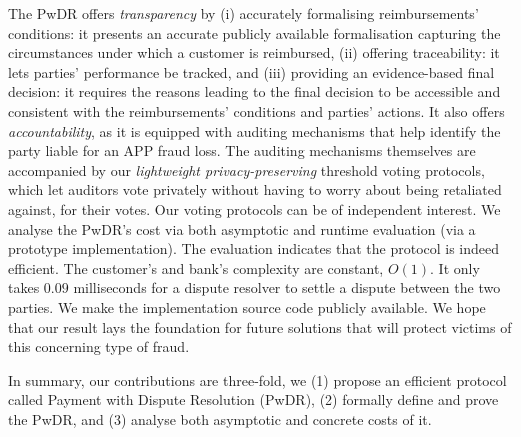   The PwDR offers \emph{transparency} by (i) accurately formalising reimbursements' conditions: it presents an accurate publicly available formalisation capturing the circumstances under which a customer is reimbursed,  (ii) offering traceability:  it lets parties'  performance be tracked, and (iii) providing an evidence-based final decision: it requires the reasons leading to the final decision to be accessible and consistent with the reimbursements' conditions and parties' actions.  It also offers \emph{accountability}, as it is equipped with auditing mechanisms that help identify the party liable for an APP fraud loss.  The auditing mechanisms themselves are accompanied by our \emph{lightweight privacy-preserving} threshold voting protocols, which let auditors vote privately without having to worry about being retaliated against,  for their votes. Our voting protocols can be of independent interest.   We analyse the PwDR's cost via both asymptotic and runtime evaluation (via a prototype implementation). The evaluation indicates that the protocol is indeed efficient. The customer's and bank's complexity are constant, $O(1)$. It only takes $0.09$ milliseconds for a dispute resolver to settle a dispute between the two parties. We make the implementation source code publicly available. We hope that our result lays the foundation for future solutions that will protect victims of this concerning type of fraud. 
  
  In summary,  our contributions are three-fold, we (1) propose an efficient protocol called Payment with Dispute Resolution (PwDR), (2) formally define and prove the PwDR, and (3) analyse both asymptotic and concrete costs of it.     




